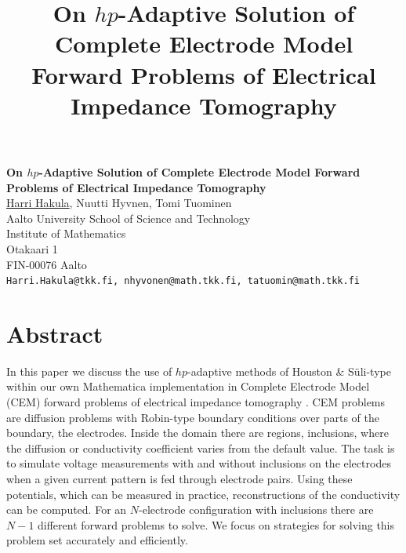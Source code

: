\title{On $hp$-Adaptive Solution of Complete Electrode Model Forward Problems of Electrical Impedance Tomography}
\author{} \institute{}

\begin{center}

\textbf{\Large On $hp$-Adaptive Solution of Complete Electrode Model Forward Problems of Electrical Impedance Tomography}\\
\vspace{10mm}
{\large \underline{Harri Hakula}, Nuutti Hyvnen, Tomi Tuominen}\\
Aalto University School of Science and Technology\\
Institute of Mathematics\\
Otakaari 1 \\
FIN-00076 Aalto\\
{\tt Harri.Hakula@tkk.fi, nhyvonen@math.tkk.fi, tatuomin@math.tkk.fi}

\end{center}

\section*{Abstract}

In this paper we discuss the use of $hp$-adaptive methods of Houston \& S\"uli-type \cite{HT} within our own Mathematica implementation in Complete Electrode Model
(CEM) forward problems  of electrical impedance tomography \cite{LHH}. CEM problems are diffusion problems with Robin-type boundary conditions over parts of the boundary, the electrodes. Inside the domain there are regions, inclusions, where the diffusion or conductivity coefficient varies from the default value. The task is to simulate voltage measurements with and without inclusions on the electrodes when a given current pattern is fed through electrode pairs. Using these potentials, which can be measured in practice, reconstructions of the conductivity can be computed. For an $N$-electrode configuration with inclusions there are $N-1$ different forward problems to solve. We focus on strategies for solving this problem set accurately and efficiently.

